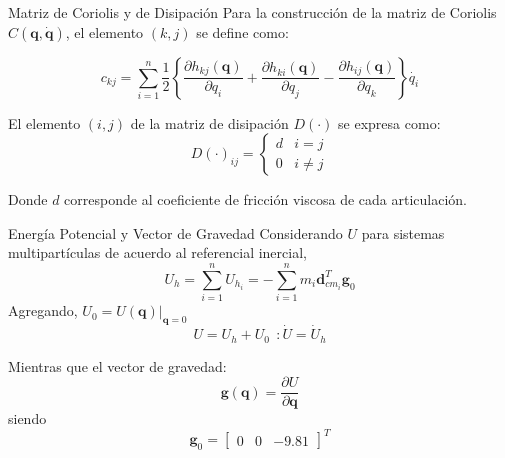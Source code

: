 \begin{frame}{Matriz de Coriolis y de Disipación}
    Para la construcción de la matriz de Coriolis $C(\boldsymbol{q},\boldsymbol{\dot{q}})$, el elemento 
    $(k,j)$ se define como:

    \begin{equation}
        c_{kj} = \sum_{i=1}^n \frac{1}{2}\left\{\frac{\partial h_{kj}(\boldsymbol{q})}{\partial q_{i}}+\frac{\partial h_{ki}(\boldsymbol{q})}{\partial q_{j}}-\frac{\partial h_{ij}(\boldsymbol{q})}{\partial q_{k}} \right\}\dot{q_i}
    \end{equation}
    
    El elemento $(i,j)$ de la matriz de disipación $D(\cdot)$ se expresa como:
    \begin{equation}
        D(\cdot)_{ij} = 
        \begin{cases}
            d & i = j \\
            0 & i \neq j
        \end{cases}
    \end{equation}

    Donde $d$ corresponde al coeficiente de fricción viscosa de cada articulación. 
\end{frame}

\begin{frame}{Energía Potencial y Vector de Gravedad}
    Considerando $U$ para sistemas multipartículas de acuerdo al referencial inercial,
    \begin{equation}
        \label{eqn:energia_potencial}
         U_{h} = \sum_{i=1}^n U_{h_{i}} =  -\sum_{i=1}^n m_i \boldsymbol{d}_{cm_i}^T \boldsymbol{g}_0
    \end{equation}
    Agregando, $U_0 = \left. U(\boldsymbol{q}) \right|_{\boldsymbol{q}=0}$
    \begin{equation}
        \label{eqn:energia_potencial_offset}
         U = U_{h}+U_0 \: \: : \dot{U} = \dot{U}_{h} 
    \end{equation}
    
    Mientras que el vector de gravedad:
    \begin{equation}
        \label{eqn:vector_gravedad}
        \boldsymbol{g}(\boldsymbol{q}) = \frac{\partial U}{\partial \boldsymbol{q}}
    \end{equation}
    siendo 
    \begin{equation}
        \label{eqn:g_0}
         \boldsymbol{g}_0 = \begin{bmatrix} 0 & 0 & -9.81 \end{bmatrix}^T
    \end{equation}
\end{frame}

